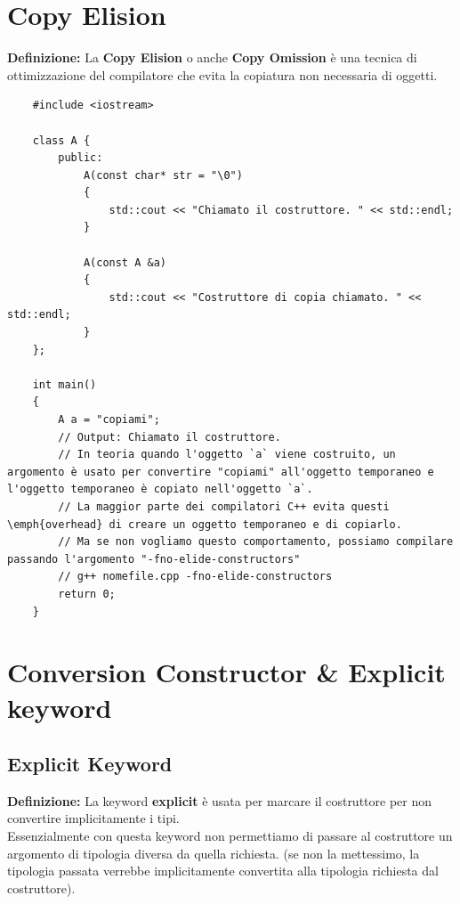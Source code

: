 
\section{Copy Elision}

\textsf{\small \textbf{Definizione: } La \textbf{Copy Elision} o anche \textbf{Copy Omission} è una tecnica di ottimizzazione del compilatore che evita la copiatura non necessaria di oggetti.} \\

\begin{lstlisting}
	#include <iostream>
	
	class A {
		public:
			A(const char* str = "\0")
			{
				std::cout << "Chiamato il costruttore. " << std::endl;
			}
		
			A(const A &a)
			{
				std::cout << "Costruttore di copia chiamato. " << std::endl;
			}
	};

	int main()
	{
		A a = "copiami";
		// Output: Chiamato il costruttore.
		// In teoria quando l'oggetto `a` viene costruito, un argomento è usato per convertire "copiami" all'oggetto temporaneo e l'oggetto temporaneo è copiato nell'oggetto `a`.
		// La maggior parte dei compilatori C++ evita questi \emph{overhead} di creare un oggetto temporaneo e di copiarlo.
		// Ma se non vogliamo questo comportamento, possiamo compilare passando l'argomento "-fno-elide-constructors"
		// g++ nomefile.cpp -fno-elide-constructors
		return 0;
	}
\end{lstlisting}


\section{Conversion Constructor \& Explicit keyword}  %

\subsection{Explicit Keyword}

\textsf{\small \textbf{Definizione: } La keyword \textbf{explicit} è usata per marcare il costruttore per non convertire implicitamente i tipi.} \\

\textsf{\small Essenzialmente con questa keyword non permettiamo di passare al costruttore un argomento di tipologia diversa da quella richiesta. (se non la mettessimo, la tipologia passata verrebbe implicitamente convertita alla tipologia richiesta dal costruttore).} \break

